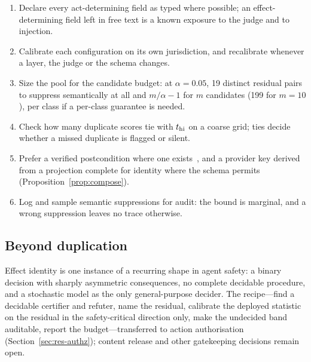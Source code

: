 \begin{enumerate}[(1),leftmargin=*,itemsep=1pt]
\item Declare every act-determining field as typed where possible; an effect-determining field left in free text is a known exposure to the judge and to injection.
\item Calibrate each configuration on its own jurisdiction, and recalibrate whenever a layer, the judge or the schema changes.
\item Size the pool for the candidate budget: at $\alpha=0.05$, 19 distinct residual pairs to suppress semantically at all and $m/\alpha-1$ for $m$ candidates (199 for $m=10$), per class if a per-class guarantee is needed.
\item Check how many duplicate scores tie with $t_{\mathrm{hi}}$ on a coarse grid; ties decide whether a missed duplicate is flagged or silent.
\item Prefer a verified postcondition where one exists~\cite{mansoor2026verified}, and a provider key derived from a projection complete for identity where the schema permits (Proposition~\ref{prop:compose}).
\item Log and sample semantic suppressions for audit: the bound is marginal, and a wrong suppression leaves no trace otherwise.
\end{enumerate}

\subsection{Beyond duplication}

Effect identity is one instance of a recurring shape in agent safety: a binary decision with sharply asymmetric consequences, no complete decidable procedure, and a stochastic model as the only general-purpose decider. The recipe---find a decidable certifier and refuter, name the residual, calibrate the deployed statistic on the residual in the safety-critical direction only, make the undecided band auditable, report the budget---transferred to action authorisation (Section~\ref{sec:res-authz}); content release and other gatekeeping decisions remain open.
